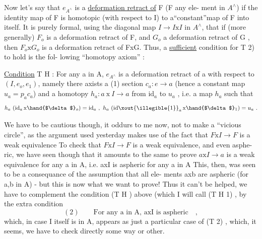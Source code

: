 
Now let's say that $e_{A^\wedge}$ is a  \uline{deformation retract of} F (F any ele-%
ment in $A^\wedge$) if the identity map of F is homotopic (with respect to I) to
a``constant''map of F into itself.  It is purely formal,  using the diagonal
map $I\to I\mathrm{x}I$ in $A^\wedge$,  that if (more generally) $F_o$ is a deformation retract
of F,  and $G_o$ a deformation retract of G ,  then $F_o\mathrm{x}G_o$ is a deformation
retract of FxG. Thus, a \uline{sufficient} condition for T 2) to hold is the fol-%
lowing ``homotopy axiom'' :

\uline{Condition}  T H :  For any  a in A,   $e_{A^\wedge}$ is a deformation retract of
a with respect to $(I,e_o,e_1)$,  namely there axists a
(1)  section  $c_a : e\to a$  (hence a constant map $u_a = p_a c_a$)
and a homotopy  $h_a : a\ \mathrm{x}\ I\to a$ from $\mathrm{id}_a$  to $u_a$ ,  i.e.
a map $h_a$ such that
\[ h_a\ (\mathrm{id}_a\,\mathrm{x}\hand{$\delta$}_o) = \mathrm{id}_a\ ,\ h_a\ (\mathrm{id}\xout{\illegible{1}}_a\,\mathrm{x}\hand{$\delta$}_1) = u_a\ . \]

We have to be cautious though,  it oddurs to me now,  not to make a
``vicious circle'',  as the  argument used yesterday  makes use of the fact
that   $F\mathrm{x}I\to F$  is a weak equivalence  To check that $F\mathrm{x}I\to F$ is a weak equivalence,  and even asphe-%
ric,  we have seen though that it amounts to the same to prove $a\mathrm{x}I\to a$ is a
weak equivalence for any a in A,  i.e. axI is aspheric for any a in A
This,  then,  was seen to be a consequance of the assumption that all ele-%
ments axb are aspheric (for a,b in A)  -  but this  is now what we want to
prove!  Thus it can't be helped,  we have to complement the condition
(T H ) above  (which I will call  (T H 1) ,  by the extra condition
\[ (2)\qquad \text{For any a in A,  axI is aspheric}\quad , \]
which,  in case I itself is in A,  appears as just a particular case of
(T 2) ,  which, it seems,  we have to check directly some way or other.

